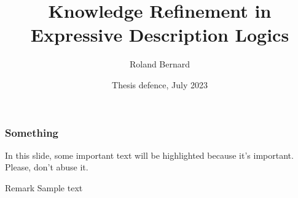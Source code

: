 \documentclass{beamer}
\title{
    Knowledge Refinement in \\
    Expressive Description Logics
}
\author{Roland Bernard}
\institute{
  Faculty of Engineering\\
  Free University of Bozen-Bolzano
}
\date{Thesis defence, July 2023}
\begin{document}
\frame{\titlepage}
\logo{}

\begin{frame}
\frametitle{Something}

In this slide, some important text will be
\alert{highlighted} because it's important.
Please, don't abuse it.

\begin{block}{Remark}
Sample text
\end{block}
\end{frame}
\end{document}

